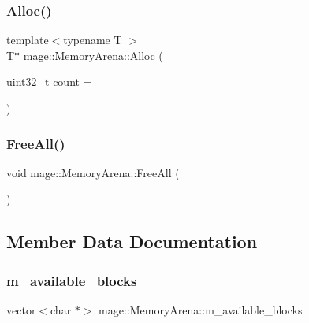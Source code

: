 \hypertarget{classmage_1_1_memory_arena_a16431dbfc49ddaee803fb0ab52303302}{}\label{classmage_1_1_memory_arena_a16431dbfc49ddaee803fb0ab52303302} 
\subsubsection{\texorpdfstring{Alloc()}{Alloc()}\hspace{0.1cm}{\footnotesize\ttfamily [2/2]}}
{\footnotesize\ttfamily template$<$typename T $>$ \\
T$\ast$ mage\+::\+Memory\+Arena\+::\+Alloc (\begin{DoxyParamCaption}\item[{uint32\+\_\+t}]{count = {} }\end{DoxyParamCaption})}

\hypertarget{classmage_1_1_memory_arena_a30452ffc5813f5c62232713020fbe405}{}\label{classmage_1_1_memory_arena_a30452ffc5813f5c62232713020fbe405} 
\subsubsection{\texorpdfstring{Free\+All()}{FreeAll()}}
{\footnotesize\ttfamily void mage\+::\+Memory\+Arena\+::\+Free\+All (\begin{DoxyParamCaption}{ }\end{DoxyParamCaption})}



\subsection{Member Data Documentation}
\hypertarget{classmage_1_1_memory_arena_a2295aae794acabd26ef9c1ff4908b029}{}\label{classmage_1_1_memory_arena_a2295aae794acabd26ef9c1ff4908b029} 
\subsubsection{\texorpdfstring{m\+\_\+available\+\_\+blocks}{m\_available\_blocks}}
{\footnotesize\ttfamily vector$<$char $\ast$$>$ mage\+::\+Memory\+Arena\+::m\+\_\+available\+\_\+blocks\hspace{0.3cm}{\ttfamily [private]}}

